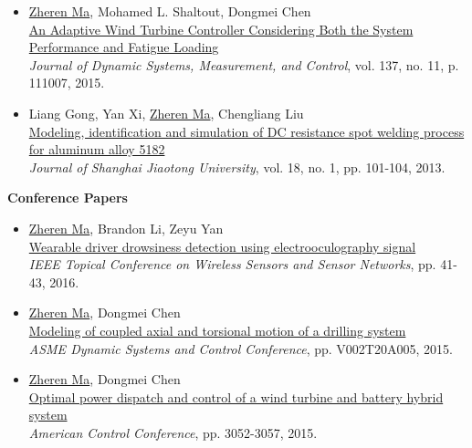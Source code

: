 \documentclass[margin, 9pt]{res} %
\begin{document}
\begin{resume}
\begin{itemize}[leftmargin=*]
\item \underline{Zheren Ma}, Mohamed L. Shaltout, Dongmei Chen\\
          \href{http://dynamicsystems.asmedigitalcollection.asme.org/article.aspx?articleid=2468735}
          {An Adaptive Wind Turbine Controller Considering Both the System Performance and Fatigue Loading}\\
          \textit{Journal of Dynamic Systems, Measurement, and Control}, vol. 137, no. 11, p. 111007, 2015.

\item Liang Gong, Yan Xi, \underline{Zheren Ma}, Chengliang Liu\\
          \href{http://link.springer.com/article/10.1007\%2Fs12204-013-1371-8}
          {Modeling, identification and simulation of DC resistance spot welding process for aluminum alloy 5182}\\
          \textit{Journal of Shanghai Jiaotong University}, vol. 18, no. 1, pp. 101-104, 2013.
\end{itemize}

{\large\textbf{Conference Papers}}
\begin{itemize}[leftmargin=*] \itemsep 0pt
    \item \underline{Zheren Ma}, Brandon Li, Zeyu Yan\\
         \href{http://ieeexplore.ieee.org/xpl/login.jsp?tp=&arnumber=7444317&url=http\%3A\%2F\%2Fieeexplore.ieee.org\%2Fxpls\%2Fabs_all.jsp\%3Farnumber\%3D7444317}
          {Wearable driver drowsiness detection using electrooculography signal}\\
          \textit{IEEE Topical Conference on Wireless Sensors and Sensor Networks}, pp. 41-43, 2016.

	\item \underline{Zheren Ma}, Dongmei Chen\\
          \href{http://proceedings.asmedigitalcollection.asme.org/proceeding.aspx?articleid=2481922}{Modeling of coupled axial and torsional motion of a drilling system}\\
          \textit{ASME Dynamic Systems and Control Conference}, pp. V002T20A005, 2015.

	\item \underline{Zheren Ma},  Dongmei Chen\\
          \href{http://ieeexplore.ieee.org/xpl/login.jsp?tp=&arnumber=7171801&url=http\%3A\%2F\%2Fieeexplore.ieee.org\%2Fxpls\%2Fabs_all.jsp\%3Farnumber\%3D7171801}
          {Optimal power dispatch and control of a wind turbine and battery hybrid system}\\
          \textit{American Control Conference}, pp. 3052-3057, 2015.


\end{itemize}
\end{resume}
\end{document}
